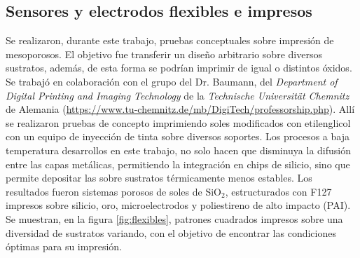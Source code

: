  	\subsection{Sensores y electrodos flexibles e impresos}

 	  Se realizaron, durante este trabajo, pruebas conceptuales sobre impresión de mesoporosos. El objetivo fue transferir un diseño arbitrario sobre diversos sustratos, además, de esta forma se podrían imprimir \pdm\space de igual o distintos óxidos. Se trabajó en colaboración con el grupo del Dr. Baumann, del \textit{Department of Digital Printing and Imaging Technology} de la \textit{Technische Universität Chemnitz} de Alemania (\url{https://www.tu-chemnitz.de/mb/DigiTech/professorship.php}). Allí se realizaron pruebas de concepto imprimiendo soles modificados con etilenglicol con un equipo de inyección de tinta sobre diversos soportes. Los procesos a baja temperatura desarrollos en este trabajo, no solo hacen que disminuya la difusión entre las capas metálicas, permitiendo la integración en chips de silicio, sino que permite depositar las \pdm\space sobre sustratos térmicamente menos estables. Los resultados fueron sistemas porosos de soles de SiO$_2$, estructurados con F127 impresos sobre silicio, oro, microelectrodos y poliestireno de alto impacto (PAI). Se muestran, en la figura \ref{fig:flexibles}, patrones cuadrados impresos sobre una diversidad de sustratos variando, con el objetivo de encontrar las condiciones óptimas para su impresión.

